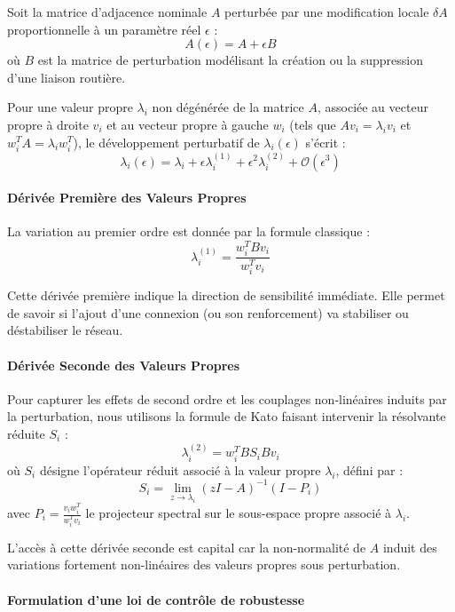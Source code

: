 \documentclass[10pt, a4paper]{article}
\begin{document}
Soit la matrice d'adjacence nominale \(A\) perturbée par une
modification locale \(\delta A\) proportionnelle à un paramètre réel
\(\epsilon\) : \[A(\epsilon) = A + \epsilon B\] où \(B\) est la matrice
de perturbation modélisant la création ou la suppression d'une liaison
routière.

Pour une valeur propre \(\lambda_i\) non dégénérée de la matrice \(A\),
associée au vecteur propre à droite \(v_i\) et au vecteur propre à
gauche \(w_i\) (tels que \(A v_i = \lambda_i v_i\) et
\(w_i^T A = \lambda_i w_i^T\)), le développement perturbatif de
\(\lambda_i(\epsilon)\) s'écrit :
\[\lambda_i(\epsilon) = \lambda_i + \epsilon \lambda_i^{(1)} + \epsilon^2 \lambda_i^{(2)} + \mathcal{O}(\epsilon^3)\]

\paragraph{Dérivée Première des Valeurs
Propres}\label{duxe9rivuxe9e-premiuxe8re-des-valeurs-propres}

La variation au premier ordre est donnée par la formule classique :
\[\lambda_i^{(1)} = \frac{w_i^T B v_i}{w_i^T v_i}\]

Cette dérivée première indique la direction de sensibilité immédiate.
Elle permet de savoir si l'ajout d'une connexion (ou son renforcement)
va stabiliser ou déstabiliser le réseau.

\paragraph{Dérivée Seconde des Valeurs
Propres}\label{duxe9rivuxe9e-seconde-des-valeurs-propres}

Pour capturer les effets de second ordre et les couplages non-linéaires
induits par la perturbation, nous utilisons la formule de Kato faisant
intervenir la résolvante réduite \(S_i\) :
\[\lambda_i^{(2)} = w_i^T B S_i B v_i\] où \(S_i\) désigne l'opérateur
réduit associé à la valeur propre \(\lambda_i\), défini par :
\[S_i = \lim_{z \to \lambda_i} (zI - A)^{-1} (I - P_i)\] avec
\(P_i = \frac{v_i w_i^T}{w_i^T v_i}\) le projecteur spectral sur le
sous-espace propre associé à \(\lambda_i\).

L'accès à cette dérivée seconde est capital car la non-normalité de
\(A\) induit des variations fortement non-linéaires des valeurs propres
sous perturbation.

\paragraph{Formulation d'une loi de contrôle de
robustesse}\label{formulation-dune-loi-de-contruxf4le-de-robustesse}
\end{document}

